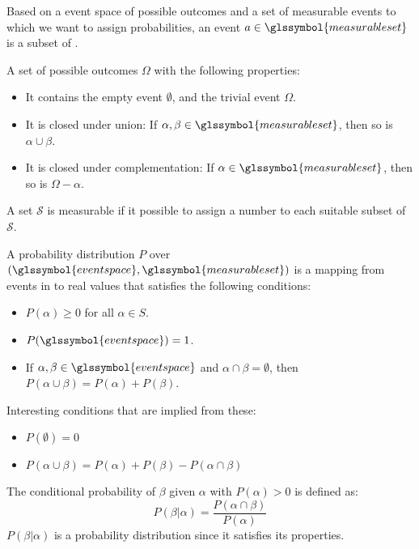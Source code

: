 {%
  Based on a \gls{event space} of possible outcomes  and a set of measurable events  to which we want to assign probabilities, an event $a \in \glssymbol{measurable set}$ is a subset of .\\
}

{%
  A set of possible outcomes $\Omega$ with the following properties:
  \begin{itemize}
    \item It contains the empty event $\emptyset$, and the trivial event $\Omega$.
    \item It is closed under union: If $\alpha, \beta \in \glssymbol{measurable set}$, then so is $\alpha \cup \beta$.
    \item It is closed under complementation: If $\alpha \in \glssymbol{measurable set}$, then so is $\Omega - \alpha$.
  \end{itemize}
}

{%
  A set $\mathcal{S}$ is measurable if it possible to assign a number to each suitable subset of $\mathcal{S}$.
}

{%
  A probability distribution $P$ over $(\glssymbol{event space},\glssymbol{measurable set})$ is a mapping from events in  to real values that satisfies the following conditions:
  \begin{itemize}
    \item $P(\alpha)\geq 0 $ for all $ \alpha \in S$.
    \item $P(\glssymbol{event space})=1$.
    \item If $\alpha,\beta\in \glssymbol{event space}$ and $\alpha\cap\beta = \emptyset$, then $P(\alpha\cup\beta)=P(\alpha)+P(\beta)$.
  \end{itemize}
  Interesting conditions that are implied from these:
  \begin{itemize}
    \item $P(\emptyset)=0$
    \item $P(\alpha\cup\beta)=P(\alpha)+P(\beta)-P(\alpha\cap\beta)$
  \end{itemize}
}

{%
  The conditional probability of $\beta$ given $\alpha$ with $P(\alpha)>0$ is defined as:
  \begin{equation*}
    P(\beta|\alpha)=\frac{P(\alpha\cap\beta)}{P(\alpha)}
  \end{equation*}
  $P(\beta|\alpha)$ is a \gls{probability distribution} since it satisfies its properties.
}

